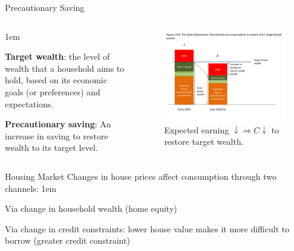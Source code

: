 \documentclass[11pt,aspectratio=43,usenames,dvipsnames]{beamer}
\let\olditemize=\itemize
\let\endolditemize=\enditemize
\renewenvironment{itemize}{\olditemize \itemsep1em}{\endolditemize}
\let\oldenumerate=\enumerate
\let\endoldenumerate=\endenumerate
\renewenvironment{enumerate}{\oldenumerate \itemsep1em}{ \endoldenumerate}
\theoremstyle{definition}
\begin{document}
\begin{frame}{Precautionary Saving}
\label{slide:Precautionary_Saving}
    \begin{columns}
        \begin{column}{0.4\textwidth}
            \begin{itemize}
                \item \textbf{Target wealth}: the level of wealth that a household aims to hold, based on its economic goals (or preferences) and expectations.
                \item \textbf{Precautionary saving}: An increase in saving to restore wealth to its target level.
            \end{itemize}
        \end{column}
        \begin{column}{0.6\textwidth}
            \begin{figure}
                \centering
                \includegraphics[width=\textwidth]{./figures/9.pdf}
                \caption{Expected earning $ \downarrow  \Rightarrow C \downarrow $ to restore target wealth.}
            \end{figure}

        \end{column}
    \end{columns}

\end{frame}

\begin{frame}{Housing Market}
\label{slide:Housing_Market}
    Changes in house prices affect consumption through two channels:
    \begin{enumerate}
        \item Via change in household wealth (home equity)
        \item Via change in credit constraints: lower house value makes it more difficult to borrow (greater credit constraint)
    \end{enumerate}


\end{frame}
\end{document}
